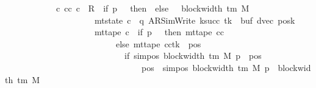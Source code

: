 \begin{isabellebody}
\ \ \ \ \ \ \ \ \ \ \ {\isasymLongrightarrow}\ {\isasymexists}c{\isacharprime}{\kern0pt}{\isacharprime}{\kern0pt}{\isachardot}{\kern0pt}\ {\isacharparenleft}{\kern0pt}cc{\isacharcomma}{\kern0pt}\ c{\isacharprime}{\kern0pt}{\isacharprime}{\kern0pt}{\isacharparenright}{\kern0pt}\ {\isasymin}\ R{\isacharprime}{\kern0pt}\ {\isacharcircum}{\kern0pt}{\isacharcircum}{\kern0pt}\ {\isacharparenleft}{\kern0pt}if\ p{\isacharprime}{\kern0pt}\ {\isacharequal}{\kern0pt}\ {}\ then\ {}\ else\ {}\ {\isacharasterisk}{\kern0pt}\ block{\isacharunderscore}{\kern0pt}width\ {\isacharparenleft}{\kern0pt}{\isasymGamma}{\isacharunderscore}{\kern0pt}tm\ M{\isacharparenright}{\kern0pt}{\isacharparenright}{\kern0pt}\isanewline
\ \ \ \ \ \ \ \ \ \ \ \ \ \ \ \ \ \ \ \ {\isasymand}\ mt{\isacharunderscore}{\kern0pt}state\ c{\isacharprime}{\kern0pt}{\isacharprime}{\kern0pt}\ {\isacharequal}{\kern0pt}\ {\isacharparenleft}{\kern0pt}q{\isacharcomma}{\kern0pt}\ AR{\isacharunderscore}{\kern0pt}SimWrite{\isacharcomma}{\kern0pt}\ k{\isacharunderscore}{\kern0pt}succ\ tk{\isacharprime}{\kern0pt}{\isacharcomma}{\kern0pt}\ {}{\isacharcomma}{\kern0pt}\ buf{\isacharcomma}{\kern0pt}\ dvec{\isacharcomma}{\kern0pt}\ posk{\isacharparenright}{\kern0pt}\isanewline
\ \ \ \ \ \ \ \ \ \ \ \ \ \ \ \ \ \ \ \ {\isasymand}\ mt{\isacharunderscore}{\kern0pt}tape\ c{\isacharprime}{\kern0pt}{\isacharprime}{\kern0pt}\ {\isacharequal}{\kern0pt}\ {\isacharparenleft}{\kern0pt}if\ p{\isacharprime}{\kern0pt}\ {\isacharequal}{\kern0pt}\ {}\ then\ mt{\isacharunderscore}{\kern0pt}tape\ cc\isanewline
\ \ \ \ \ \ \ \ \ \ \ \ \ \ \ \ \ \ \ \ \ \ \ \ \ \ else\ {\isacharparenleft}{\kern0pt}mt{\isacharunderscore}{\kern0pt}tape\ cc{\isacharparenright}{\kern0pt}{\isacharparenleft}{\kern0pt}tk{\isacharprime}{\kern0pt}\ {\isacharcolon}{\kern0pt}{\isacharequal}{\kern0pt}\ {\isacharparenleft}{\kern0pt}{\isasymlambda}pos{\isachardot}{\kern0pt}\isanewline
\ \ \ \ \ \ \ \ \ \ \ \ \ \ \ \ \ \ \ \ \ \ \ \ \ \ \ \ if\ sim{\isacharunderscore}{\kern0pt}pos\ {\isacharparenleft}{\kern0pt}block{\isacharunderscore}{\kern0pt}width\ {\isacharparenleft}{\kern0pt}{\isasymGamma}{\isacharunderscore}{\kern0pt}tm\ M{\isacharparenright}{\kern0pt}{\isacharparenright}{\kern0pt}\ p{\isacharprime}{\kern0pt}\ {\isasymle}\ pos\isanewline
\ \ \ \ \ \ \ \ \ \ \ \ \ \ \ \ \ \ \ \ \ \ \ \ \ \ \ \ \ \ \ {\isasymand}\ pos\ {\isacharless}{\kern0pt}\ sim{\isacharunderscore}{\kern0pt}pos\ {\isacharparenleft}{\kern0pt}block{\isacharunderscore}{\kern0pt}width\ {\isacharparenleft}{\kern0pt}{\isasymGamma}{\isacharunderscore}{\kern0pt}tm\ M{\isacharparenright}{\kern0pt}{\isacharparenright}{\kern0pt}\ p{\isacharprime}{\kern0pt}\ {\isacharplus}{\kern0pt}\ block{\isacharunderscore}{\kern0pt}width\ {\isacharparenleft}{\kern0pt}{\isasymGamma}{\isacharunderscore}{\kern0pt}tm\ M{\isacharparenright}{\kern0pt}\isanewline

\end{isabellebody}
